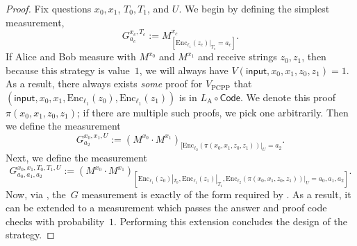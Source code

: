 \documentclass[11pt]{article}
\newcommand{\codee}{\mathrm{Enc}}
\begin{document}
\begin{proof}
Fix questions $x_0, x_1$, $T_0, T_1$, and $U$.  We begin by defining the simplest measurement,
\begin{equation}\label{eq:i-dont-know-what-to-call-this}
G^{x_c, T_c}_{a_c} := M^{x_c}_{[\codee_{\ell_1}(z_c)|_{T_c} = a_c]}.
\end{equation}
If Alice and Bob measure with $M^{x_0}$ and $M^{x_1}$ and receive strings $z_0, z_1$,
then because this strategy is value~$1$,
we will always have $V(\mathsf{input}, x_0, x_1, z_0, z_1) = 1$.
As a result, there always exists \emph{some} proof for $V_{\mathrm{PCPP}}$
that $(\mathsf{input}, x_0, x_1, \codee_{\ell_1}(z_0), \codee_{\ell_1}(z_1))$ is in $L_{\mathrm{A}} \circ \mathsf{Code}$.
We denote this proof $\pi(x_0, x_1, z_0, z_1)$; if there are multiple such proofs, we pick one arbitrarily.
Then we define the measurement
\begin{equation}\label{eq:i-dont-know-what-to-call-this-part-two-return-of-the-bat}
G^{x_0, x_1, U}_{a_2} := (M^{x_0} \cdot M^{x_1})_{[\codee_{\ell_2}(\pi(x_0, x_1, z_0, z_1))|_{U} = a_2}.
\end{equation}
Next, we define the measurement
\begin{equation*}
G^{x_0, x_1, T_0, T_1, U}_{a_0, a_1, a_2}
:= (M^{x_0}\cdot M^{x_1})_{[\codee_{\ell_1}(z_0)|_{T_0}, \codee_{\ell_1}(z_1)|_{T_1}, \codee_{\ell_2}(\pi(x_0, x_1, z_0, z_1))|_{U} = a_0, a_1, a_2]}.
\end{equation*}
Now, via ,
the~$G$ measurement is exactly of the form required by .
As a result, it can be extended to a measurement which passes the answer and proof code checks with probability~$1$.
Performing this extension concludes the design of the strategy.


\end{proof}
\end{document}

